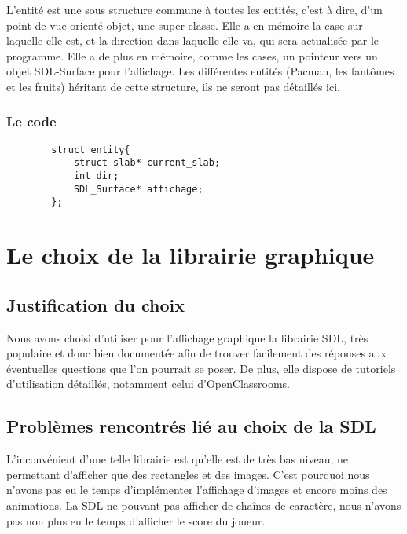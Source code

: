 \documentclass[a4paper,11pt]{article}
\begin{document}
    L'entité est une sous structure commune à toutes les entités, c'est à dire, d'un point de vue orienté objet, une super classe. Elle a en mémoire la case sur laquelle elle est, et la direction dans laquelle elle va, qui sera actualisée par le programme. Elle a de plus en mémoire, comme les cases, un pointeur vers un objet SDL-Surface pour l'affichage. Les différentes entités (Pacman, les fantômes et les fruits) héritant de cette structure, ils ne seront pas détaillés ici.

    \subsubsection{Le code}

    \begin{verbatim}
        struct entity{
            struct slab* current_slab;
            int dir;
            SDL_Surface* affichage;
        };
    \end{verbatim}

\section{Le choix de la librairie graphique}

    \subsection{Justification du choix}
    
    Nous avons choisi d'utiliser pour l'affichage graphique la librairie SDL, très populaire et donc bien documentée afin de trouver facilement des réponses aux éventuelles questions que l'on pourrait se poser. De plus, elle dispose de tutoriels d'utilisation détaillés, notamment celui d'OpenClassrooms.

    \subsection{Problèmes rencontrés lié au choix de la SDL}
    
    L'inconvénient d'une telle librairie est qu'elle est de très bas niveau, ne permettant d'afficher que des rectangles et des images. C'est pourquoi nous n'avons pas eu le temps d'implémenter l'affichage d'images et encore moins des animations. La SDL ne pouvant pas afficher de chaînes de caractère, nous n'avons pas non plus eu le temps d'afficher le score du joueur.
\end{document}
